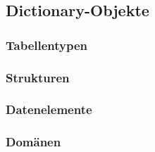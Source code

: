\subsection{Dictionary-Objekte}
\label{Dictionary-Objekte}

\subsubsection{Tabellentypen}
\label{Tabellentypen}


\subsubsection{Strukturen}
\label{Strukturen}


\subsubsection{Datenelemente}
\label{Datenelemente}


\subsubsection{Domänen}
\label{Domänen}

